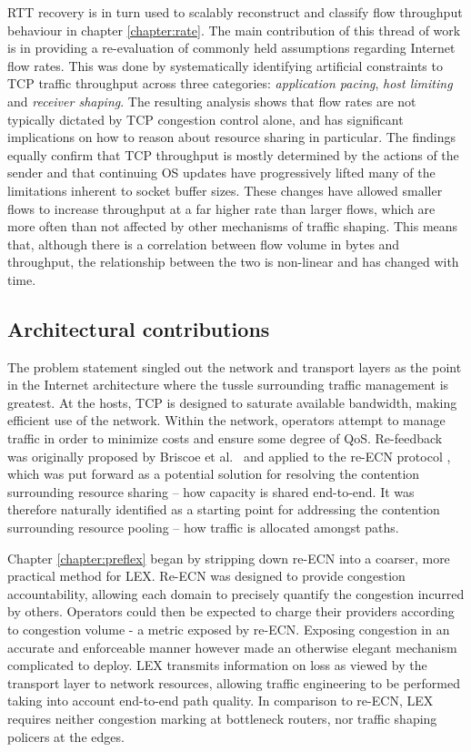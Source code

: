 \ac{RTT} recovery is in turn used to scalably reconstruct and classify flow throughput behaviour in chapter \ref{chapter:rate}.
The main contribution of this thread of work is in providing a re-evaluation of commonly held assumptions regarding Internet flow rates.
This was done by systematically identifying artificial constraints to \ac{TCP} traffic throughput across three categories: \emph{application pacing}, \emph{host limiting} and \emph{receiver shaping}. 
The resulting analysis shows that flow rates are not typically dictated by \ac{TCP} congestion control alone, and has significant implications on how to reason about resource sharing in particular.
The findings equally confirm that \ac{TCP} throughput is mostly determined by the actions of the sender and that continuing \acl{OS} updates have progressively lifted many of the limitations inherent to socket buffer sizes. 
These changes have allowed smaller flows to increase throughput at a far higher rate than larger flows, which are more often than not affected by other mechanisms of traffic shaping.
This means that, although there is a correlation between flow volume in bytes and throughput, the relationship between the two is non-linear and has changed with time.

\subsection{Architectural contributions}

The problem statement singled out the network and transport layers as the point in the Internet architecture where the tussle surrounding traffic management is greatest.
At the hosts, \ac{TCP} is designed to saturate available bandwidth, making efficient use of the network.
Within the network, operators attempt to manage traffic in order to minimize costs and ensure some degree of \ac{QoS}.
Re-feedback was originally proposed by Briscoe et al.\ \cite{Briscoe:2005p346} and applied to the re-\ac{ECN} protocol \cite{Briscoe:2008p494}, which was put forward as a potential solution for resolving the contention surrounding resource sharing -- how capacity is shared end-to-end.
It was therefore naturally identified as a starting point for addressing the contention surrounding resource pooling -- how traffic is allocated amongst paths.

Chapter \ref{chapter:preflex} began by stripping down re-\ac{ECN} into a coarser, more practical method for \acf{LEX}.
Re-\ac{ECN} was designed to provide congestion accountability, allowing each domain to precisely quantify the congestion incurred by others.
Operators could then be expected to charge their providers according to congestion volume - a metric exposed by re-\ac{ECN}.
Exposing congestion in an accurate and enforceable manner however made an otherwise elegant mechanism complicated to deploy.
\ac{LEX} transmits information on loss as viewed by the transport layer to network resources, allowing traffic engineering to be performed taking into account end-to-end path quality.
In comparison to re-\ac{ECN}, \ac{LEX} requires neither congestion marking at bottleneck routers, nor traffic shaping policers at the edges.

